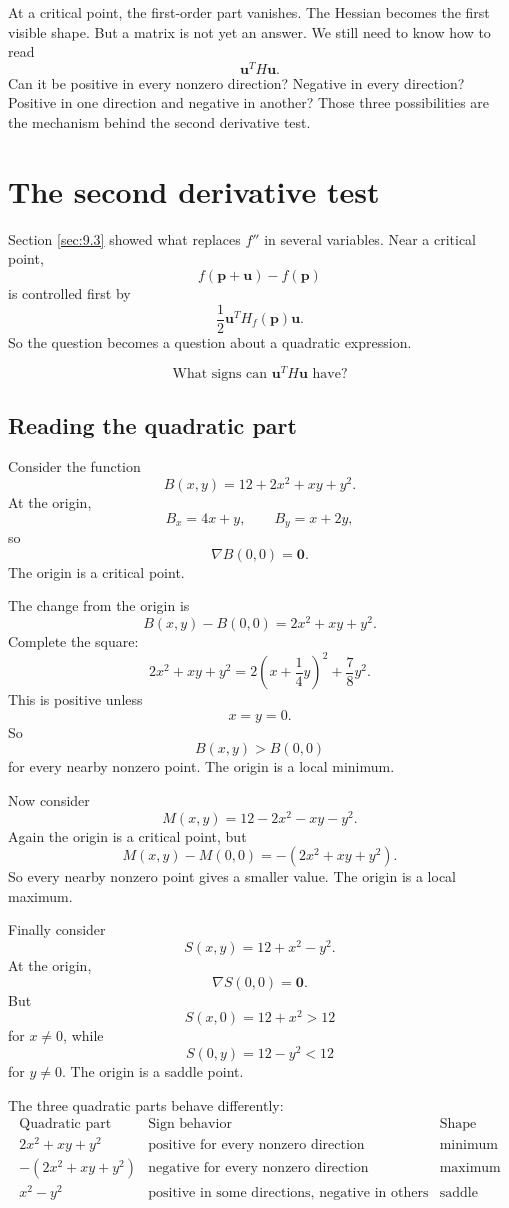At a critical point, the first-order part vanishes.  The Hessian becomes the first
visible shape.  But a matrix is not yet an answer.  We still need to know how to read
\[
    \mathbf u^T H\mathbf u.
\]
Can it be positive in every nonzero direction?  Negative in every direction?  Positive
in one direction and negative in another?  Those three possibilities are the mechanism
behind the second derivative test.

\section{The second derivative test}
\label{sec:9.4}

Section \ref{sec:9.3} showed what replaces \(f''\) in several variables.  Near a critical
point,
\[
    f(\mathbf p+\mathbf u)-f(\mathbf p)
\]
is controlled first by
\[
    \frac12\mathbf u^T H_f(\mathbf p)\mathbf u.
\]
So the question becomes a question about a quadratic expression.

\[
    \text{What signs can } \mathbf u^T H\mathbf u \text{ have?}
\]

\subsection{Reading the quadratic part}

Consider the function
\[
    B(x,y)=12+2x^2+xy+y^2.
\]
At the origin,
\[
    B_x=4x+y,
    \qquad
    B_y=x+2y,
\]
so
\[
    \nabla B(0,0)=\mathbf 0.
\]
The origin is a critical point.

The change from the origin is
\[
    B(x,y)-B(0,0)=2x^2+xy+y^2.
\]
Complete the square:
\[
    2x^2+xy+y^2
    =
    2\left(x+\frac14y\right)^2+\frac78y^2.
\]
This is positive unless
\[
    x=y=0.
\]
So
\[
    B(x,y)>B(0,0)
\]
for every nearby nonzero point.  The origin is a local minimum.

Now consider
\[
    M(x,y)=12-2x^2-xy-y^2.
\]
Again the origin is a critical point, but
\[
    M(x,y)-M(0,0)=-(2x^2+xy+y^2).
\]
So every nearby nonzero point gives a smaller value.  The origin is a local maximum.

Finally consider
\[
    S(x,y)=12+x^2-y^2.
\]
At the origin,
\[
    \nabla S(0,0)=\mathbf 0.
\]
But
\[
    S(x,0)=12+x^2>12
\]
for \(x\ne0\), while
\[
    S(0,y)=12-y^2<12
\]
for \(y\ne0\).  The origin is a saddle point.

The three quadratic parts behave differently:
\[
\begin{array}{c|c|c}
\text{Quadratic part} & \text{Sign behavior} & \text{Shape}\\ \hline
2x^2+xy+y^2 & \text{positive for every nonzero direction} & \text{minimum}\\[1mm]
-(2x^2+xy+y^2) & \text{negative for every nonzero direction} & \text{maximum}\\[1mm]
x^2-y^2 & \text{positive in some directions, negative in others} & \text{saddle}
\end{array}
\]

